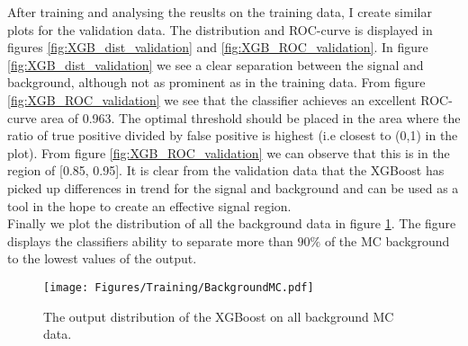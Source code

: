 \documentclass{article}
\begin{document}
\newline
After training and analysing the reuslts on the training data, I create similar plots for the validation data. The distribution and ROC-curve is displayed in figures \ref{fig:XGB_dist_validation}
and \ref{fig:XGB_ROC_validation}. In figure \ref{fig:XGB_dist_validation} we see a clear separation between the signal and background, although not as prominent as in the training data. From figure \ref{fig:XGB_ROC_validation} we see that the classifier achieves an excellent ROC-curve area of 0.963. The optimal threshold should be placed in the area where the ratio of true positive divided by false positive is highest (i.e closest to (0,1) in the plot). From figure \ref{fig:XGB_ROC_validation} we can observe that this is in the region of [0.85, 0.95]. It is clear from the validation data that the XGBoost has picked up differences in trend for the signal and background and can be used as a tool in the hope to create an effective signal region.
\\
Finally we plot the distribution of all the background data in figure \ref{fig:XGB_dist_background}. The figure displays the classifiers ability to separate more than $90\%$ of the MC background to the lowest values of the output. 
\begin{figure}
    \centering
    \texttt{[image: Figures/Training/BackgroundMC.pdf]}
    \caption{The output distribution of the XGBoost on all background MC data.}
    \label{fig:XGB_dist_background}
\end{figure}
\end{document}
